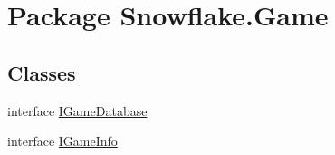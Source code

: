 \hypertarget{namespace_snowflake_1_1_game}{}\section{Package Snowflake.\+Game}
\label{namespace_snowflake_1_1_game}
\subsection*{Classes}
\begin{DoxyCompactItemize}
\item 
interface \hyperlink{interface_snowflake_1_1_game_1_1_i_game_database}{I\+Game\+Database}
\item 
interface \hyperlink{interface_snowflake_1_1_game_1_1_i_game_info}{I\+Game\+Info}
\end{DoxyCompactItemize}
